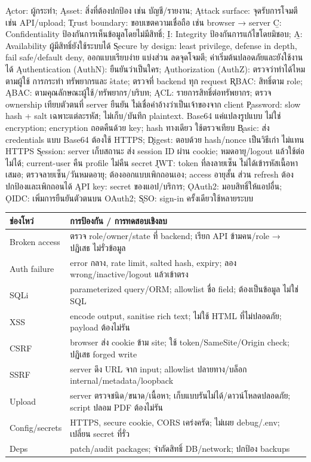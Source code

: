 \k{Actor}: ผู้กระทำ; \k{Asset}: สิ่งที่ต้องปกป้อง เช่น บัญชี/รายงาน; \k{Attack surface}: จุดรับการโจมตี เช่น API/upload; \k{Trust boundary}: ขอบเขตความเชื่อถือ เช่น browser → server
\b{C: Confidentiality} ป้องกันการเห็นข้อมูลโดยไม่มีสิทธิ์; \b{I: Integrity} ป้องกันการแก้ไขโดยมิชอบ; \b{A: Availability} ผู้มีสิทธิ์ยังใช้ระบบได้
\k{Secure by design}: least privilege, defense in depth, fail safe/default deny, ออกแบบเรียบง่าย แบ่งส่วน ลดจุดโจมตี; ค่าเริ่มต้นปลอดภัยและยังใช้งานได้
\k{Authentication (AuthN)}: ยืนยันว่าเป็นใคร; \k{Authorization (AuthZ)}: ตรวจว่าทำได้ไหม ตามผู้ใช้ การกระทำ ทรัพยากรและ \r{state}; ตรวจที่ backend ทุก request
\k{RBAC}: สิทธิ์ตาม role; \k{ABAC}: ตามคุณลักษณะผู้ใช้/ทรัพยากร/บริบท; \k{ACL}: รายการสิทธิ์ต่อทรัพยากร; ตรวจ ownership เทียบตัวตนที่ server ยืนยัน \r{ไม่เชื่อคำอ้างว่าเป็นเจ้าของจาก client}
\k{Password}: slow hash + salt เฉพาะแต่ละรหัส; ไม่เก็บ/บันทึก plaintext. Base64 แค่แปลงรูปแบบ ไม่ใช่ encryption; encryption ถอดคืนด้วย key; hash ทางเดียว ใช้ตรวจเทียบ
\k{Basic}: ส่ง credentials แบบ Base64 ต้องใช้ HTTPS; \k{Digest}: ตอบด้วย hash/nonce เป็นวิธีเก่า ไม่แทน HTTPS
\k{Session}: server เก็บสถานะ ส่ง session ID ผ่าน cookie; หมดอายุ/logout แล้วใช้ต่อไม่ได้; current-user คืน profile ไม่คืน secret
\k{JWT}: token ที่ลงลายเซ็น \r{ไม่ได้เข้ารหัสเนื้อหาเสมอ}; ตรวจลายเซ็น/วันหมดอายุ; ต้องออกแบบเพิกถอนเอง; access อายุสั้น ส่วน refresh ต้องปกป้องและเพิกถอนได้
\k{API key}: secret ของแอป/บริการ; \k{OAuth2}: มอบสิทธิ์ให้แอปอื่น; \k{OIDC}: เพิ่มการยืนยันตัวตนบน OAuth2; \k{SSO}: sign-in ครั้งเดียวใช้หลายระบบ
{\smalltable\begin{tabularx}{\linewidth}{|p{10mm}|Y|}\hline
{}ช่องโหว่ & การป้องกัน / การทดสอบเชิงลบ\\\hline
Broken access & ตรวจ role/owner/state ที่ backend; เรียก API ข้ามคน/role → ปฏิเสธ ไม่รั่วข้อมูล\\\hline
Auth failure & error กลาง, rate limit, salted hash, expiry; ลอง wrong/inactive/logout แล้วเข้าตรง\\\hline
SQLi & parameterized query/ORM; allowlist ชื่อ field; \mbox{} ต้องเป็นข้อมูล ไม่ใช่ SQL\\\hline
XSS & encode output, sanitise rich text; ไม่ใช้ HTML ที่ไม่ปลอดภัย; payload ต้องไม่รัน\\\hline
CSRF & browser ส่ง cookie ข้าม site; ใช้ token/SameSite/Origin check; ปฏิเสธ forged write\\\hline
SSRF & server ดึง URL จาก input; allowlist ปลายทาง/บล็อก internal/metadata/loopback\\\hline
Upload & server ตรวจชนิด/ขนาด/เนื้อหา; เก็บแบบรันไม่ได้/ดาวน์โหลดปลอดภัย; script ปลอม PDF ต้องไม่รัน\\\hline
Config/secrets & HTTPS, secure cookie, CORS เคร่งครัด; ไม่เผย debug/.env; เปลี่ยน secret ที่รั่ว\\\hline
Deps & patch/audit packages; จำกัดสิทธิ์ DB/network; ปกป้อง backups\\\hline
\end{tabularx}}
